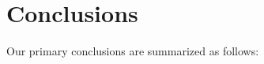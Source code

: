\documentclass[linenumbers,tighten,trackchanges,twocolumn]{aastex631}
\begin{document}




\section{Conclusions} \label{sec:conclusions}

Our primary conclusions are summarized as follows:
\end{document}
